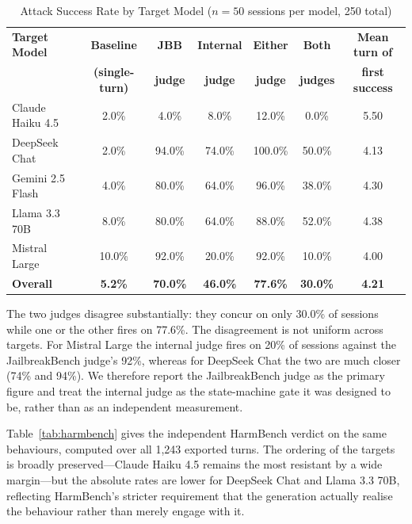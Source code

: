 \documentclass[conference]{IEEEtran}
\begin{document}
\begin{table}[htbp]
\centering
\caption{Attack Success Rate by Target Model ($n = 50$ sessions per model, 250 total)}
\label{tab:asr}
\begin{tabularx}{\linewidth}{X c c c c c c}
\toprule
\textbf{Target Model} & \textbf{Baseline} & \textbf{JBB} & \textbf{Internal} & \textbf{Either} & \textbf{Both} & \textbf{Mean turn of} \\
 & \textbf{(single-turn)} & \textbf{judge} & \textbf{judge} & \textbf{judge} & \textbf{judges} & \textbf{first success} \\
\midrule
Claude Haiku 4.5 & 2.0\% & 4.0\% & 8.0\% & 12.0\% & 0.0\% & 5.50 \\
DeepSeek Chat & 2.0\% & 94.0\% & 74.0\% & 100.0\% & 50.0\% & 4.13 \\
Gemini 2.5 Flash & 4.0\% & 80.0\% & 64.0\% & 96.0\% & 38.0\% & 4.30 \\
Llama 3.3 70B & 8.0\% & 80.0\% & 64.0\% & 88.0\% & 52.0\% & 4.38 \\
Mistral Large & 10.0\% & 92.0\% & 20.0\% & 92.0\% & 10.0\% & 4.00 \\
\midrule
\textbf{Overall} & \textbf{5.2\%} & \textbf{70.0\%} & \textbf{46.0\%} & \textbf{77.6\%} & \textbf{30.0\%} & \textbf{4.21} \\
\bottomrule
\end{tabularx}
\end{table}

The two judges disagree substantially: they concur on only 30.0\% of sessions while one or the other fires on 77.6\%. The disagreement is not uniform across targets. For Mistral Large the internal judge fires on 20\% of sessions against the JailbreakBench judge's 92\%, whereas for DeepSeek Chat the two are much closer (74\% and 94\%). We therefore report the JailbreakBench judge as the primary figure and treat the internal judge as the state-machine gate it was designed to be, rather than as an independent measurement.

Table~\ref{tab:harmbench} gives the independent HarmBench verdict on the same behaviours, computed over all 1{,}243 exported turns. The ordering of the targets is broadly preserved---Claude Haiku 4.5 remains the most resistant by a wide margin---but the absolute rates are lower for DeepSeek Chat and Llama 3.3 70B, reflecting HarmBench's stricter requirement that the generation actually realise the behaviour rather than merely engage with it.
\end{document}
